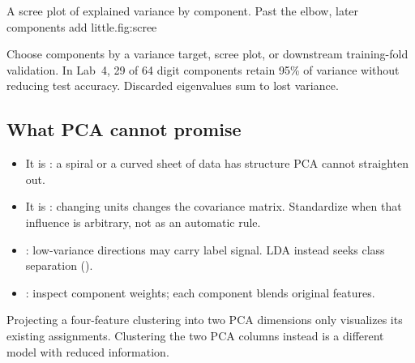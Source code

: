\begin{utpfig}{A scree plot of explained variance by component. Past the elbow, later components add little.}{fig:scree}
\end{utpfig}

Choose components by a variance target, scree plot, or downstream training-fold validation. In Lab~4, 29 of 64 digit components retain 95\% of variance without reducing test accuracy. Discarded eigenvalues sum to lost variance.

\subsection{What PCA cannot promise}
\label{sec:pca-limitations}

\begin{itemize}
  \item It is : a spiral or a curved sheet of data has structure PCA cannot straighten out.
  \item It is : changing units changes the covariance matrix. Standardize when that influence is arbitrary, not as an automatic rule.
  \item {}: low-variance directions may carry label signal. LDA instead seeks class separation ().
  \item {}: inspect component weights; each component blends original features.
\end{itemize}

\begin{pitfall}
Projecting a four-feature clustering into two PCA dimensions only visualizes its existing assignments. Clustering the two PCA columns instead is a different model with reduced information.
\end{pitfall}


